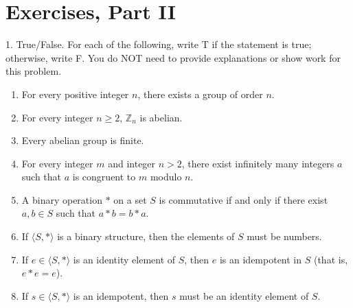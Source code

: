 \documentclass[10pt,]{book}
\theoremstyle{plain}
\theoremstyle{definition}
\theoremstyle{definition}
\theoremstyle{definition}
\theoremstyle{definition}
\numberwithin{equation}{section}
\def\Z{\mathbb{Z}}
\begin{document}
\section[{Exercises, Part II}]{Exercises, Part II}\label{exercises-3}
\begin{exerciselist}
\item[1.]\hypertarget{exercise-12}{}
        True/False. For each of the following, write T if the statement is
        true; otherwise, write F. You do NOT need to provide explanations or show work for this problem.
        \leavevmode%
\begin{enumerate}[label=(\alph*)]
\item\hypertarget{li-95}{}
              For every positive integer \(n\), there exists a group of order \(n\).
\item\hypertarget{li-96}{}
              For every integer \(n\geq 2\), \(\Z_n\) is abelian.
\item\hypertarget{li-97}{}
              Every abelian group is finite.
\item\hypertarget{li-98}{}
              For every integer \(m\) and integer \(n>2\), there exist infinitely many integers \(a\) such that \(a\) is congruent to \(m\) modulo \(n\).
\item\hypertarget{li-99}{}
              A binary operation \(*\) on a set \(S\) is commutative if and only if there exist \(a,b\in S\) such that \(a*b=b*a\).
\item\hypertarget{li-100}{}
              If \(\langle S, *\rangle\) is a binary structure, then the elements of \(S\) must be numbers.
\item\hypertarget{li-101}{}
              If \(e\in \langle S,*\rangle\) is an identity element of \(S\), then \(e\) is an idempotent in \(S\) (that is, \(e*e=e\)).
\item\hypertarget{li-102}{}
              If \(s\in \langle S,*\rangle\) is an idempotent, then \(s\) must be an identity element of \(S\).
\end{enumerate}


\end{exerciselist}
\end{document}
